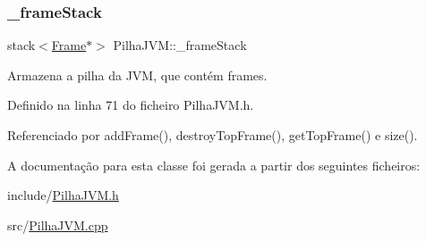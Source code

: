 \subsubsection{\texorpdfstring{\+\_\+frame\+Stack}{\_frameStack}}
{\footnotesize\ttfamily stack$<$\hyperlink{classFrame}{Frame}$\ast$$>$ Pilha\+J\+V\+M\+::\+\_\+frame\+Stack\hspace{0.3cm}{\ttfamily [private]}}

Armazena a pilha da J\+VM, que contém frames. 

Definido na linha 71 do ficheiro Pilha\+J\+V\+M.\+h.



Referenciado por add\+Frame(), destroy\+Top\+Frame(), get\+Top\+Frame() e size().



A documentação para esta classe foi gerada a partir dos seguintes ficheiros\+:\begin{DoxyCompactItemize}
\item 
include/\hyperlink{PilhaJVM_8h}{Pilha\+J\+V\+M.\+h}\item 
src/\hyperlink{PilhaJVM_8cpp}{Pilha\+J\+V\+M.\+cpp}\end{DoxyCompactItemize}
